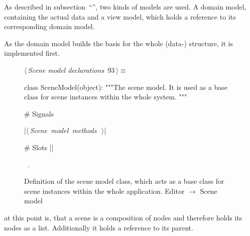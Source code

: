 \documentclass[%
    a4paper,    %
    justified,  %
    nobib,      %
    openany     %
]{tufte-book}
\makeatletter
\renewcommand{\label}[1]{\@tufte@label{##1}}%
\makeatother
\begin{document}
As described in subsection~\enquote{},
two kinds of models are used. A domain model, containing the actual data and a
view model, which holds a reference to its corresponding domain model.

As the domain model builds the basis for the whole (data-) structure, it is
implemented first.

\begin{figure}[!htbp]
\begin{flushleft} \small
\begin{minipage}{\linewidth}\label{scrap21}\raggedright\small
{} $\langle\,${\itshape Scene model declarations}\nobreak\ {\footnotesize {93}}$\,\rangle\equiv$
\vspace{-1ex}
\begin{pythoncode}
class SceneModel(object):
    """The scene model.
    It is used as a base class for scene instances within the
    whole system.
    """

    # Signals

    |\hbox{$\langle\,${\itshape Scene model methods}\nobreak\ {\footnotesize {}}$\,\rangle$}|

    # Slots
|\NWsep|
\end{pythoncode}
\vspace{1.5ex}
\footnotesize
\begin{list}{}{\setlength{\itemsep}{-\parsep}\setlength{\itemindent}{-\leftmargin}}
\item \NWtxtMacroRefIn\ .

\item{}
\end{list}
\end{minipage}\vspace{4ex}
\end{flushleft}
\caption{Definition of the scene model class, which acts as a base class for
scene instances within the whole application.
  \newline{}\newline{}Editor $\rightarrow$ Scene model}
\end{figure}

 at this point is, that a scene is a composition
of nodes and therefore holds its nodes as a list. Additionally it holds a
reference to its parent.
\end{document}
